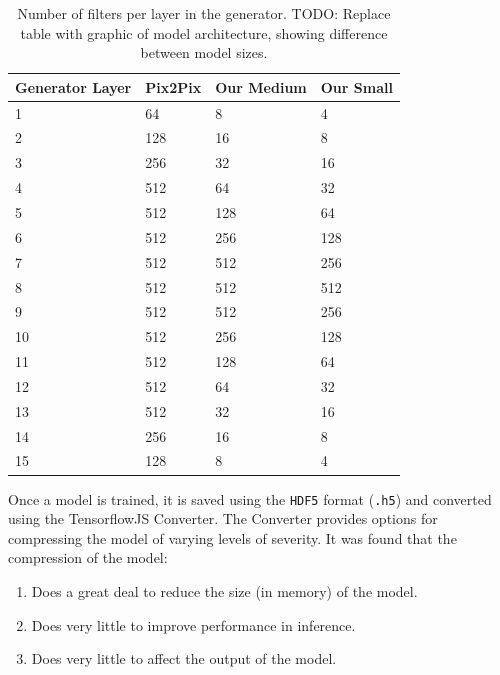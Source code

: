 \documentclass{article}
\begin{document}
\begin{small}
	\begin{table}
		\begin{center}
			\begin{tabular}{p{2cm}p{2cm}p{2cm}p{2cm}}
				\toprule
				Generator Layer & Pix2Pix & Our Medium & Our Small \\
				\midrule
				1               & 64      & 8          & 4         \\
				2               & 128     & 16         & 8         \\
				3               & 256     & 32         & 16        \\
				4               & 512     & 64         & 32        \\
				5               & 512     & 128        & 64        \\
				6               & 512     & 256        & 128       \\
				7               & 512     & 512        & 256       \\
				8               & 512     & 512        & 512       \\
				9               & 512     & 512        & 256       \\
				10              & 512     & 256        & 128       \\
				11              & 512     & 128        & 64        \\
				12              & 512     & 64         & 32        \\
				13              & 512     & 32         & 16        \\
				14              & 256     & 16         & 8         \\
				15              & 128     & 8          & 4         \\
				\bottomrule
			\end{tabular}
			\caption{Number of filters per layer in the generator. TODO: Replace table with graphic of model architecture, showing difference between model sizes.}
		\end{center}
	\end{table}
\end{small}

Once a model is trained, it is saved using the \verb|HDF5| format (\verb|.h5|) and converted using the TensorflowJS Converter. The Converter provides options for compressing the model of varying levels of severity. It was found that the compression of the model:

\begin{enumerate}
	\item Does a great deal to reduce the size (in memory) of the model.
	\item Does very little to improve performance in inference.
	\item Does very little to affect the output of the model.
\end{enumerate}
\end{document}
